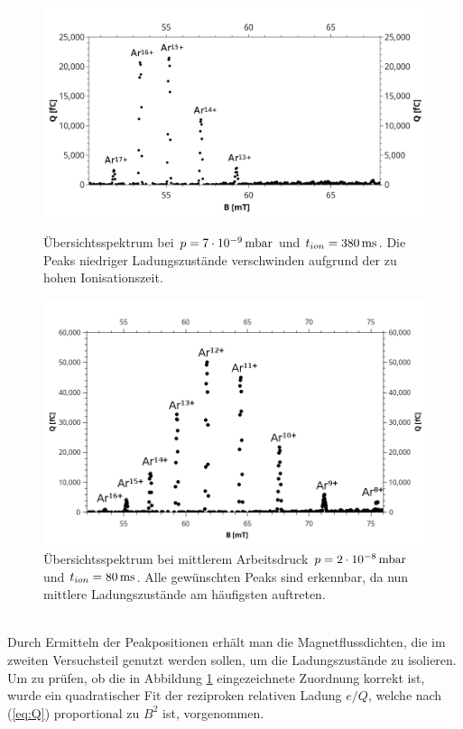 		\begin{figure}[h]
		    \centering
		    \begin{minipage}{0.9\linewidth}
		        \centering
		        \includegraphics[width=0.8\linewidth]{pic/7e-9_beschriftet}
		        \caption{Übersichtsspektrum bei $p = \unit[7\cdot 10^{-9}]{mbar}$ und $t_{ion} = \unit[380]{ms}$. Die Peaks niedriger Ladungszustände verschwinden aufgrund der zu hohen Ionisationszeit.}
		        \label{fig:7e-9}
		    \end{minipage}
		    \vfill
		    \begin{minipage}{0.9\linewidth}
		        \centering
		        \includegraphics[width=0.8\linewidth]{pic/2e-8_beschriftet}
		        \caption{Übersichtsspektrum bei mittlerem Arbeitsdruck $p = \unit[2\cdot10^{-8}]{mbar}$ und $t_{ion} = \unit[80]{ms}$. Alle gewünschten Peaks sind erkennbar, da nun mittlere Ladungszustände am häufigsten auftreten.}
		        \label{fig:2e-8}
		    \end{minipage}
		\end{figure}
		\ \\
		Durch Ermitteln der Peakpositionen erhält man die Magnetflussdichten, die im zweiten Versuchsteil genutzt werden sollen, um die Ladungszustände zu isolieren. Um zu prüfen, ob die in Abbildung \ref{fig:2e-8} eingezeichnete Zuordnung korrekt ist, wurde ein quadratischer Fit der reziproken relativen Ladung $e/Q$, welche nach (\ref{eq:Q}) proportional zu $B^2$ ist, vorgenommen.

